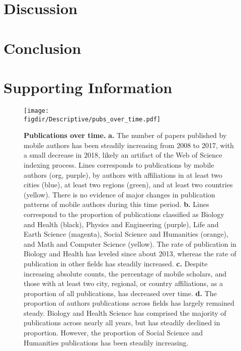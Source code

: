 \documentclass[12pt]{article} %
\def\figdir{../Figs}
\newcommand{\beginsupplement}{%
        \setcounter{table}{0}
        \renewcommand{\thetable}{S\arabic{table}}%
        \setcounter{figure}{0}
        \renewcommand{\thefigure}{S\arabic{figure}}%
     }
\begin{document}
%
% 
\section*{Discussion}



%
% 
\section*{Conclusion}



\newpage
\clearpage
\beginsupplement
\section{Supporting Information}



%
%
\begin{figure}[p!]
	\centering
	\label{fig:supp:pubs_over_time}
	\texttt{[image: \\figdir/Descriptive/pubs\_over\_time.pdf]}
	\caption{
		\textbf{Publications over time.}
		\textbf{a.}
		The number of papers published by mobile authors has been steadily increasing from 2008 to 2017, with a small decrease in 2018,  likely an artifact of the Web of Science indexing process.
		Lines corresponds to publications by mobile authors (org, purple), by authors with affiliations in at least two cities (blue), at least two regions (green), and at least two countries (yellow).
		There is no evidence of major changes in publication patterns of mobile authors during this time period. 
		\textbf{b.}
		Lines correspond to the proportion of publications classified as Biology and Health (black), Physics and Engineering (purple), Life and Earth Science (magenta), Social Science and Humanities (orange), and Math and Computer Science (yellow).
		The rate of publication in Biology and Health has leveled since about 2013, whereas the rate of publication in other fields has steadily increased. 
		\textbf{c.} 
		Despite increasing absolute counts, the percentage of mobile scholars, and those with at least two city, regional, or country affiliations, as a proportion of all publications, has decreased over time. 
		\textbf{d.} 
		The proportion of authors publications across fields has largely remained steady.
		Biology and Health Science has comprised the majority of publications across nearly all years, but has steadily declined in proportion. 
		However, the proportion of Social Science and Humanities publications has been steadily increasing. 
	}
\end{figure}
\end{document}
